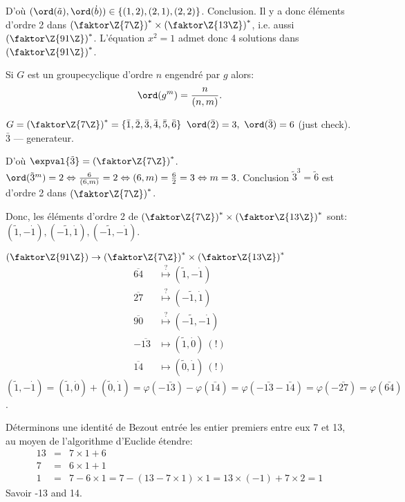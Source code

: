 D'où $(\ord(\tilde a),\ord(\dot b))\in \{(1,2),(2,1),(2,2)\}$. Conclusion. Il y a donc  éléments d'ordre 2 dans $\left( \faktor\Z{7\Z} \right)^\ast \times \left( \faktor\Z{13\Z} \right)^\ast$, i.e. aussi $\left(\faktor\Z{91\Z}\right)^\ast$. L'équation $x^2=1$ admet donc 4 solutions dans $\left(\faktor\Z{91\Z}\right)^\ast$.

\begin{rappel}
	Si $G$ est un groupecyclique d'ordre $n$ engendré par $g$ alors:
	$$\ord(g^m)=\frac n{(n,m)}.$$
	\begin{remark}
		$G=\left(\faktor\Z{7\Z}\right)^\ast=\{\bar 1, \bar 2, \bar 3,\bar 4,\bar 5,\bar 6\}$
		$\ord(\bar 2)=3,\ \ord(\bar 3)=6$ (just check). $\bar 3$ --- generateur.
	\end{remark}
	D'où $\expval{\tilde 3}=\left(\faktor\Z{7\Z}\right)^\ast$.
	$\ord(\tilde 3^m)=2\Leftrightarrow \frac 6{(6,m)}=2\Leftrightarrow (6,m)=\frac 62 = 3 \Leftrightarrow m=3$. Conclusion $\tilde 3^3=\tilde 6$ est d'ordre 2 dans $\left(\faktor\Z{7\Z}\right)^\ast$.
	
	Donc, les éléments d'ordre 2 de $\left(\faktor\Z{7\Z}\right)^\ast\times\left(\faktor\Z{13\Z}\right)^\ast$ sont: $(\tilde 1, -\dot 1),(-\tilde 1, \dot 1),(-\tilde 1, -\dot 1)$. 
	
	$\left(\faktor\Z{91\Z}\right)\rightarrow\left(\faktor\Z{7\Z}\right)^\ast\times\left(\faktor\Z{13\Z}\right)^\ast$
	\begin{align*}
		\overline{64}  &\overset{?}{\mapsto} (\tilde 1, -\dot 1)\\
		\overline{27}  &\overset{?}{\mapsto} (-\tilde 1, \dot 1)\\
		\overline{90}  &\overset{?}{\mapsto} (-\tilde 1, -\dot 1)\\
		-\overline{13}  &\mapsto (\tilde 1, \dot 0)\ (!)\\
		\overline{14}  &\mapsto (\tilde 0, \dot 1)\ (!)
	\end{align*}
	$(\tilde 1, -\dot 1)=(\tilde 1, \dot 0)+(\tilde 0, \dot 1)=\varphi (-\bar{13})-\varphi (\bar{14})=\varphi (-\bar{13}-\bar{14})=\varphi (-\bar{27})=\varphi (\bar{64})$.
	
	Déterminons une identité de Bezout entrée les entier premiers entre eux 7 et 13, au moyen de l'algorithme d'Euclide étendre:
	\begin{align*}
		13 &=& 7\times 1+ 6\\
		7 &=& 6\times 1+1\\
		1 &=& 7-6\times 1=7-(13-7\times 1)\times 1=13\times (-1)+7\times 2=1
	\end{align*}
	Savoir -13 and 14.
\end{rappel}

